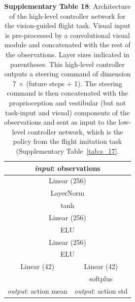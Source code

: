 \documentclass[sn-mathphys-num]{sn-jnl}%
\theoremstyle{thmstyleone}	%
\theoremstyle{thmstyletwo}	%
\theoremstyle{thmstylethree}	%
\begin{document}
\begin{appendices}
\begin{table}[htbp]
	\centering
	\small
	\caption{\textbf{Supplementary Table 18}:
		Architecture of the high-level controller network for the vision-guided flight task. 
		Visual input is pre-processed by a convolutional visual module and concatenated with the rest of the observations. 
		Layer sizes indicated in parentheses. 
		This high-level controller outputs a steering command of dimension 7 $ \times $ (future steps + 1). 
		The steering command is then concatenated with the proprioception and vestibular (but not task-input and visual) components of the observations and sent as input to the low-level controller network, which is the policy from the flight imitation task (Supplementary Table~\ref{tab:s_17}.
	}
	\begin{tabular}{cc}
		\toprule
		\multicolumn{2}{c}{\textit{input}: observations}             \\
		\midrule
		\multicolumn{2}{c}{Linear (256)}        \\
		\multicolumn{2}{c}{LayerNorm}      \\
		\multicolumn{2}{c}{tanh}     \\
		\multicolumn{2}{c}{Linear (256)}      \\
		\multicolumn{2}{c}{ELU}       \\
		\multicolumn{2}{c}{Linear (256)}       \\
		\multicolumn{2}{c}{ELU}      \\
		\midrule
		Linear (42)     &  Linear (42)  \\
		&  softplus \\
		\textit{output}: action mean     &  \textit{output}: action std  \\
		\bottomrule
	\end{tabular}%
	\label{tab:s_18}%
\end{table}%




\end{appendices}
\end{document}
